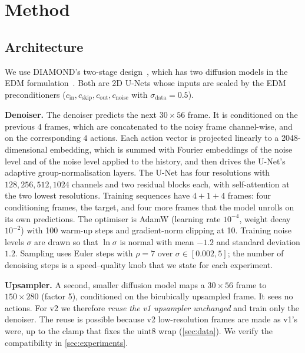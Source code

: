 \section{Method}
\label{sec:method}
\subsection{Architecture}
We use DIAMOND's two-stage design~\cite{alonso2024diamond}, which has two diffusion models in the EDM formulation~\cite{karras2022edm}.
Both are 2D U-Nets whose inputs are scaled by the EDM preconditioners ($c_\mathrm{in}, c_\mathrm{skip}, c_\mathrm{out}, c_\mathrm{noise}$ with $\sigma_\mathrm{data}=0.5$).

\textbf{Denoiser.}
The denoiser predicts the next $30{\times}56$ frame.
It is conditioned on the previous $4$ frames, which are concatenated to the noisy frame channel-wise, and on the corresponding $4$ actions.
Each action vector is projected linearly to a 2048-dimensional embedding, which is summed with Fourier embeddings of the noise level and of the noise level applied to the history, and then drives the U-Net's adaptive group-normalisation layers.
The U-Net has four resolutions with $128,256,512,1024$ channels and two residual blocks each, with self-attention at the two lowest resolutions.
Training sequences have $4+1+4$ frames: four conditioning frames, the target, and four more frames that the model unrolls on its own predictions.
The optimiser is AdamW (learning rate $10^{-4}$, weight decay $10^{-2}$) with 100 warm-up steps and gradient-norm clipping at 10.
Training noise levels $\sigma$ are drawn so that $\ln\sigma$ is normal with mean $-1.2$ and standard deviation $1.2$.
Sampling uses Euler steps with $\rho=7$ over $\sigma\in[0.002,5]$; the number of denoising steps is a speed--quality knob that we state for each experiment.

\textbf{Upsampler.}
A second, smaller diffusion model maps a $30{\times}56$ frame to $150{\times}280$ (factor 5), conditioned on the bicubically upsampled frame.
It sees no actions.
For v2 we therefore \emph{reuse the v1 upsampler unchanged} and train only the denoiser.
The reuse is possible because v2 low-resolution frames are made as v1's were, up to the clamp that fixes the uint8 wrap (\cref{sec:data}).
We verify the compatibility in \cref{sec:experiments}.

